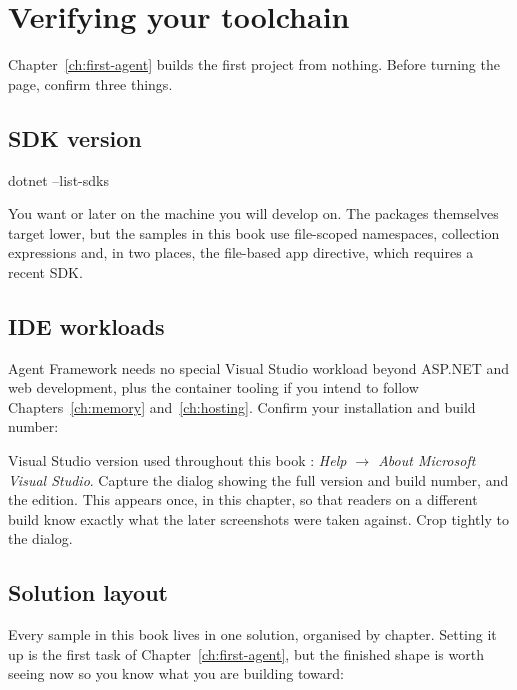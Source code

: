\section{Verifying your toolchain}
\label{sec:toolchain}

Chapter~\ref{ch:first-agent} builds the first project from nothing. Before
turning the page, confirm three things.

\subsection{SDK version}

\begin{shellcmd}
dotnet --list-sdks
\end{shellcmd}

You want \dotnetver{} or later on the machine you will develop on. The packages
themselves target lower, but the samples in this book use file-scoped namespaces,
collection expressions and, in two places, the  file-based app
directive, which requires a recent SDK.

\subsection{IDE workloads}

Agent Framework needs no special Visual Studio workload beyond ASP.NET and web
development, plus the container tooling if you intend to follow
Chapters~\ref{ch:memory} and~\ref{ch:hosting}. Confirm your installation and
build number:

%
{Visual Studio version used throughout this book}%
{\vsver{}: \emph{Help $\rightarrow$ About Microsoft Visual Studio}. Capture the
dialog showing the full version and build number, and the edition. This appears
once, in this chapter, so that readers on a different build know exactly what the
later screenshots were taken against. Crop tightly to the dialog.}

\subsection{Solution layout}

Every sample in this book lives in one solution, organised by chapter. Setting it
up is the first task of Chapter~\ref{ch:first-agent}, but the finished shape is
worth seeing now so you know what you are building toward:

